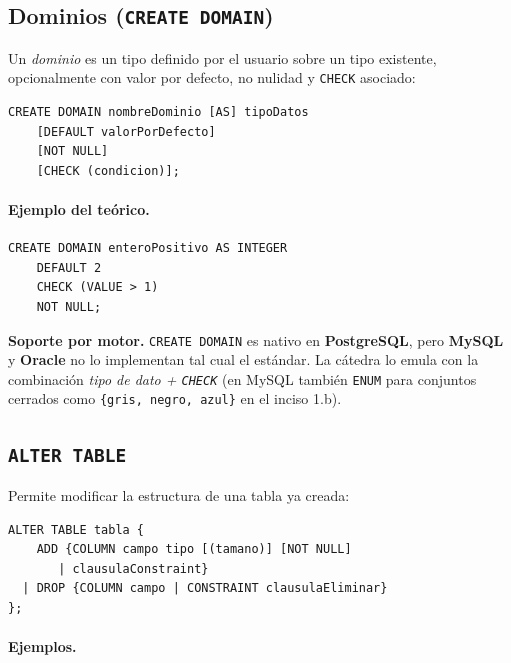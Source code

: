 \documentclass[11pt,a4paper]{article}
\begin{document}
\subsection{Dominios (\texttt{CREATE DOMAIN})}

Un \emph{dominio} es un tipo definido por el usuario sobre un tipo existente,
opcionalmente con valor por defecto, no nulidad y \texttt{CHECK} asociado:

\begin{lstlisting}
CREATE DOMAIN nombreDominio [AS] tipoDatos
    [DEFAULT valorPorDefecto]
    [NOT NULL]
    [CHECK (condicion)];
\end{lstlisting}

\paragraph{Ejemplo del teórico.}

\begin{lstlisting}
CREATE DOMAIN enteroPositivo AS INTEGER
    DEFAULT 2
    CHECK (VALUE > 1)
    NOT NULL;
\end{lstlisting}

\begin{nota}
\textbf{Soporte por motor.} \texttt{CREATE DOMAIN} es nativo en
\textbf{PostgreSQL}, pero \textbf{MySQL} y \textbf{Oracle} no lo
implementan tal cual el estándar. La cátedra lo emula con la combinación
\emph{tipo de dato + \texttt{CHECK}} (en MySQL también \texttt{ENUM} para
conjuntos cerrados como \texttt{\{gris, negro, azul\}} en el inciso 1.b).
\end{nota}

\subsection{\texttt{ALTER TABLE}}

Permite modificar la estructura de una tabla ya creada:

\begin{lstlisting}
ALTER TABLE tabla {
    ADD {COLUMN campo tipo [(tamano)] [NOT NULL]
       | clausulaConstraint}
  | DROP {COLUMN campo | CONSTRAINT clausulaEliminar}
};
\end{lstlisting}

\paragraph{Ejemplos.}
\end{document}
